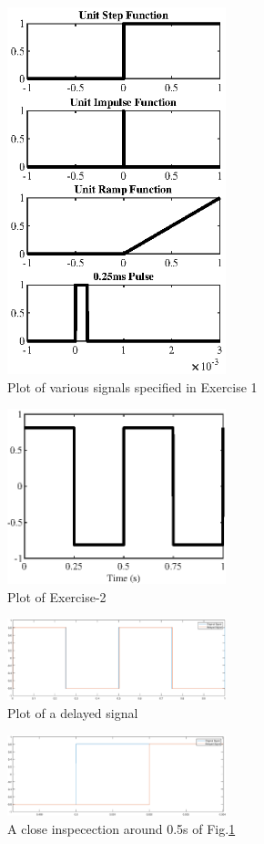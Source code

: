 \documentclass[12pt,conference,a4paper,twocolumn]{IEEEtran}
\begin{document}
\begin{figure}[h]
\centering
\includegraphics[width=2.5in]{exc1.eps}
\caption{Plot of various signals specified in Exercise 1}
\end{figure}

\begin{figure}[ht]
\centering
\includegraphics[width=2.5in]{exc2.eps}
\caption{Plot of Exercise-2}
\end{figure}

\begin{figure}[h!]
\centering
\includegraphics[width=2.5in]{exc3_1.eps}
\caption{Plot of a delayed signal}
\label{delay_signal}
\end{figure}

\begin{figure}[h!]
\centering
\includegraphics[width=2.5in]{exc3_2.eps}
\caption{A close inspecection around 0.5s of Fig.\ref{delay_signal}}
\end{figure}
\end{document}
